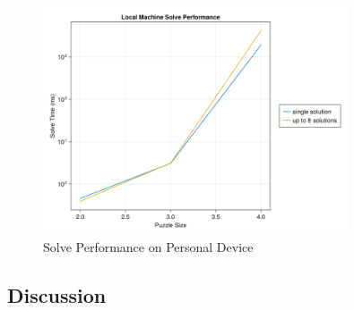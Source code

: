 \documentclass[11pt]{article}
\begin{document}
\begin{figure}[h]
  \centering
  \includegraphics[width=0.8\textwidth]{host_perf}
  \caption{Solve Performance on Personal Device}
\end{figure}


\subsection{Discussion}

\end{document}
